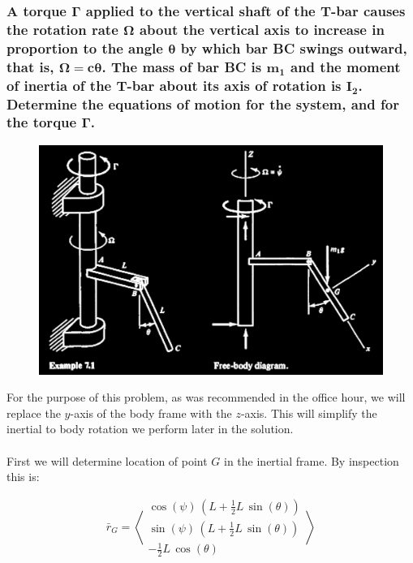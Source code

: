 \documentclass[12pt, letterpaper]{../assignment}
\begin{document}
\subsubsection*{A torque $\bm{\Gamma}$ applied to the vertical shaft of the T-bar
causes the rotation rate $\bm{\Omega}$ about the vertical axis to increase in proportion to the angle $\bm{\theta}$ by which bar BC swings outward,
that is, $\bm{\Omega = c\theta}$.
The mass of bar BC is $\bm{m_1}$ and the moment of inertia of the T-bar about its axis of rotation is $\bm{I_2}$.
Determine the equations of motion for the system, and for the torque $\bm{\Gamma}$.}

\begin{figure}[H]
    \centering
    \includegraphics[scale=0.5,frame]{images/Problem_2.png}
\end{figure}


For the purpose of this problem,
as was recommended in the office hour,
we will replace the $y$-axis of the body frame with the $z$-axis.
This will simplify the inertial to body rotation we perform later in the solution.
\\\\
First we will determine location of point $G$ in the inertial frame.
By inspection this is:

$$ \bar{r}_G = \left<\begin{array}{c}
\cos \left(\psi \right)\,{\left(L+\frac{1}{2}L\,\sin \left(\theta \right)\right)}\\
\sin \left(\psi \right)\,{\left(L+\frac{1}{2}L\,\sin \left(\theta \right)\right)}\\
-\frac{1}{2}L\,\cos \left(\theta \right)
\end{array}\right> $$
\end{document}
